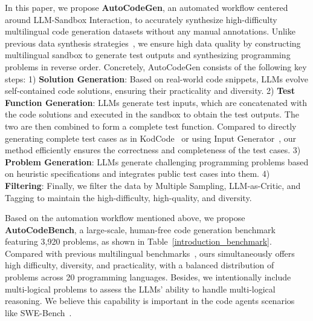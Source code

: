 In this paper, we propose \textbf{AutoCodeGen}, an automated workflow centered around LLM-Sandbox Interaction, to accurately synthesize high-difficulty multilingual code generation datasets without any manual annotations. Unlike previous data synthesis strategies~\citep{luo2024wizardcoder,magicoder,xu2025kodcode,li2025codeio}, we ensure high data quality by constructing multilingual sandbox to generate test outputs and synthesizing programming problems in reverse order. Concretely, AutoCodeGen consists of the following key steps: 1) \textbf{Solution Generation}: Based on real-world code snippets, LLMs evolve self-contained code solutions, ensuring their practicality and diversity. 2) \textbf{Test Function Generation}: LLMs generate test inputs, which are concatenated with the code solutions and executed in the sandbox to obtain the test outputs. The two are then combined to form a complete test function. Compared to directly generating complete test cases as in KodCode~\citep{xu2025kodcode} or using Input Generator~\citep{li2025codeio}, our method efficiently ensures the correctness and completeness of the test cases. 3) \textbf{Problem Generation}: LLMs generate challenging programming problems based on heuristic specifications and integrates public test cases into them. 4) \textbf{Filtering}: Finally, we filter the data by Multiple Sampling, LLM-as-Critic, and Tagging to maintain the high-difficulty, high-quality, and diversity. 

Based on the automation workflow mentioned above, we propose \textbf{AutoCodeBench}, a large-scale, human-free code generation benchmark featuring 3,920 problems, as shown in Table~\ref{introduction_benchmark}. Compared with previous multilingual benchmarks~\citep{cassano2022multiplescalableextensibleapproach,fullstackbench,chai2025mceval}, ours simultaneously offers high difficulty, diversity, and practicality, with a balanced distribution of problems across 20 programming languages. Besides, we intentionally include multi-logical problems to assess the LLMs' ability to handle multi-logical reasoning. We believe this capability is important in the code agents scenarios like SWE-Bench~\citep{jimenez2024swebench}. 

